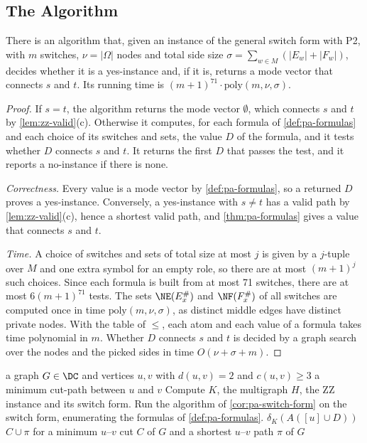 \subsection{The Algorithm}
\label{sec:pa-algorithm}

\begin{corollary}
\label{cor:pa-switch-form}
There is an algorithm that, given an instance of the general switch form with P2, with $m$ switches, $\nu = |\Omega|$ nodes and total side size $\sigma = \sum_{w \in M} (|E_w| + |F_w|)$, decides whether it is a yes-instance and, if it is, returns a mode vector that connects $s$ and $t$.
Its running time is $(m + 1)^{71} \cdot \mathrm{poly}(m, \nu, \sigma)$.
\end{corollary}

\begin{proof}
If $s = t$, the algorithm returns the mode vector $\emptyset$, which connects $s$ and $t$ by \cref{lem:zz-valid}(c).
Otherwise it computes, for each formula of \cref{def:pa-formulas} and each choice of its switches and sets, the value $D$ of the formula, and it tests whether $D$ connects $s$ and $t$.
It returns the first $D$ that passes the test, and it reports a no-instance if there is none.

\emph{Correctness.}
Every value is a mode vector by \cref{def:pa-formulas}, so a returned $D$ proves a yes-instance.
Conversely, a yes-instance with $s \neq t$ has a valid path by \cref{lem:zz-valid}(c), hence a shortest valid path, and \cref{thm:pa-formulas} gives a value that connects $s$ and $t$.

\emph{Time.}
A choice of switches and sets of total size at most $j$ is given by a $j$-tuple over $M$ and one extra symbol for an empty role, so there are at most $(m + 1)^j$ such choices.
Since each formula is built from at most 71 switches, there are at most $6 (m + 1)^{71}$ tests.
The sets $\NE(E^\#_x)$ and $\NF(F^\#_x)$ of all switches are computed once in time $\mathrm{poly}(m, \nu, \sigma)$, as distinct middle edges have distinct private nodes.
With the table of $\leq$, each atom and each value of a formula takes time polynomial in $m$.
Whether $D$ connects $s$ and $t$ is decided by a graph search over the nodes and the picked sides in time $O(\nu + \sigma + m)$.
\end{proof}

\begin{algorithm}[tb]
\caption{A minimum cut-path for an instance $(G, u, v)$ of the open case}
\label{alg:pa-open-case}
\begin{algorithmic}[1]
\Require a graph $G \in \DC$ and vertices $u, v$ with $d(u, v) = 2$ and $c(u, v) \geq 3$
\Ensure a minimum cut-path between $u$ and $v$
\State Compute $K$, the multigraph $H$, the ZZ instance and its switch form.
\State Run the algorithm of \cref{cor:pa-switch-form} on the switch form, enumerating the formulas of \cref{def:pa-formulas}.
\State \Return $\delta_K(A([u] \cup D))$
\Else
\State \Return $C \cup \pi$ for a minimum $u$--$v$ cut $C$ of $G$ and a shortest $u$--$v$ path $\pi$ of $G$
\EndIf
\end{algorithmic}
\end{algorithm}

